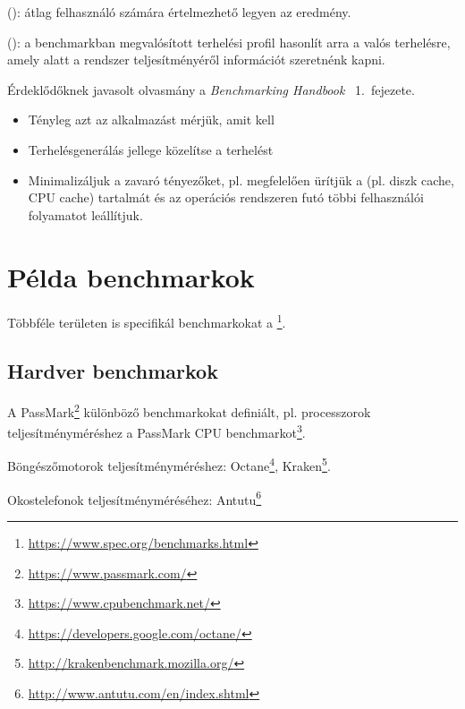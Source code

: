 \begin{definicio}
	 (): átlag felhasználó számára értelmezhető legyen az eredmény.
\end{definicio}

\begin{definicio}
	 (): a benchmarkban megvalósított terhelési profil hasonlít arra a valós terhelésre, amely alatt a rendszer teljesítményéről információt szeretnénk kapni.
\end{definicio}

Érdeklődőknek javasolt olvasmány a \emph{Benchmarking Handbook}~\cite{DBLP:books/mk/Gray93} 1.~fejezete.

\begin{itemize}
	\item Tényleg azt az alkalmazást mérjük, amit kell
	\item Terhelésgenerálás jellege közelítse a  terhelést
	\item Minimalizáljuk a zavaró tényezőket, pl. megfelelően ürítjük a  (pl. diszk cache, CPU cache) tartalmát és az operációs rendszeren futó többi felhasználói folyamatot leállítjuk.
\end{itemize}

\section{Példa benchmarkok\kieg}

Többféle területen is specifikál benchmarkokat a \footnote{\url{https://www.spec.org/benchmarks.html}}.

\subsection{Hardver benchmarkok}

A PassMark\footnote{\url{https://www.passmark.com/}} különböző benchmarkokat definiált, pl. processzorok teljesítményméréshez a PassMark CPU benchmarkot\footnote{\url{https://www.cpubenchmark.net/}}.

Böngészőmotorok teljesítményméréshez: Octane\footnote{\url{https://developers.google.com/octane/}},
Kraken\footnote{\url{http://krakenbenchmark.mozilla.org/}}.

Okostelefonok teljesítményméréséhez: Antutu\footnote{\url{http://www.antutu.com/en/index.shtml}}

